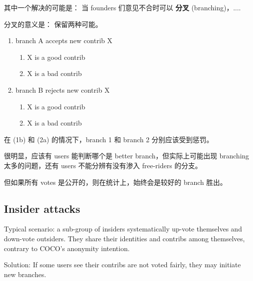 \documentclass[12pt, orivec]{article}
\newcommand{\cc}[2]{#1}
\newcommand{\cc}[2]{#2}
\begin{document}
\cc{
其中一个解决的可能是： 当 founders 们意见不合时可以 \textbf{分叉} (branching)，....
}{
A possible solution is via \textbf{branching} when founders disagree with each other.
}

\cc{
分叉的意义是： 保留两种可能。 
}{
The essence of branching is:  to preserve both options in a disagreement.
}

\begin{enumerate}
	\item branch A accepts new contrib X
	\begin{enumerate}
		\item X is a good contrib
		\item X is a bad contrib
	\end{enumerate}
	\item branch B rejects new contrib X
	\begin{enumerate}
		\item X is a good contrib
		\item X is a bad contrib
	\end{enumerate}
\end{enumerate}

\cc{
在 (1b) 和 (2a) 的情况下，branch 1 和 branch 2 分别应该受到惩罚。
}{
In cases (1b) and (2a), branch 1 and 2 should be penalized respectively.
}

\cc{
很明显，应该有 users 能判断哪个是 better branch，但实际上可能出现 branching 太多的问题，还有 users 不能分辨有没有渗入 free-riders 的分支。 
}{
Obviously, there should exist users who can determine which branches are better, but in practice there may be too many branches to consider.  Users may be unable to tell which branches are contaminated with free-riders. 
}

\cc{
但如果所有 votes 是公开的，则在统计上，始终会是较好的 branch 胜出。 
}{
However, if all votes are openly visible, then statistically we may believe that good branches will win out eventually.	
}

\subsection{Insider attacks}

Typical scenario:  a sub-group of insiders systematically up-vote themselves and down-vote outsiders.  They share their identities and contribs among themselves, contrary to COCO's anonymity intention.

Solution:  If some users see their contribs are not voted fairly, they may initiate new branches.
\end{document}
